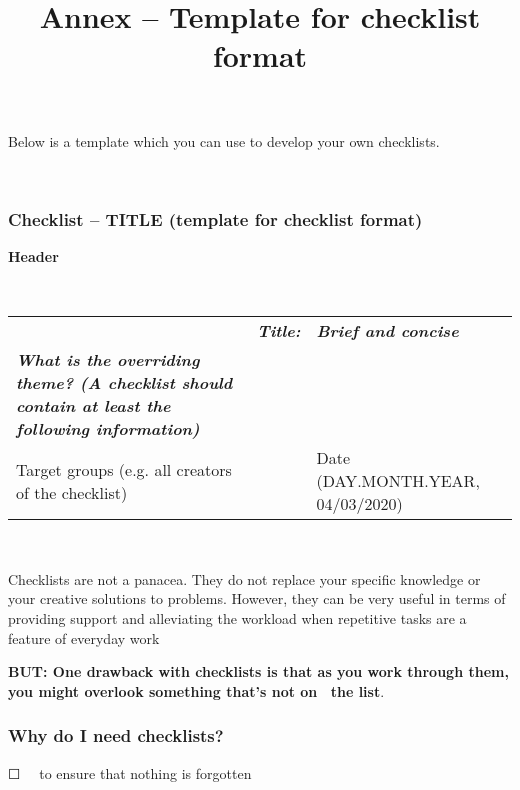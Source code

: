 \documentclass{article}
\begin{document}
\title{Annex – Template for checklist format}

\maketitle





Below is a template which you can use to develop your own checklists.


 


\subsubsection{Checklist – TITLE (template for checklist format)}\label{H9231130}



\textbf{Header}


 


\begin{tabu} to \textwidth { |X|X|X| }
\hline



 & \emph{\textbf{Title:}} & \emph{\textbf{Brief and concise}}
 \\


\emph{\textbf{What is the overriding theme? (A checklist should contain at least the following information)}} &   &  
 \\


Target groups (e.g. all creators of the checklist) &   & Date (DAY.MONTH.YEAR, 04/03/2020)
 \\
\hline

\end{tabu}

 


Checklists are not a panacea. They do not replace your specific knowledge or your creative solutions to problems. However, they can be very useful in terms of providing support and alleviating the workload when repetitive tasks are a feature of everyday work 


\textbf{BUT: One drawback with checklists is that as you work through them, you might overlook something that's not on  the list}.


\subsubsection{Why do I need checklists?}\label{H1070827}



☐   to ensure that nothing is forgotten
\end{document}
